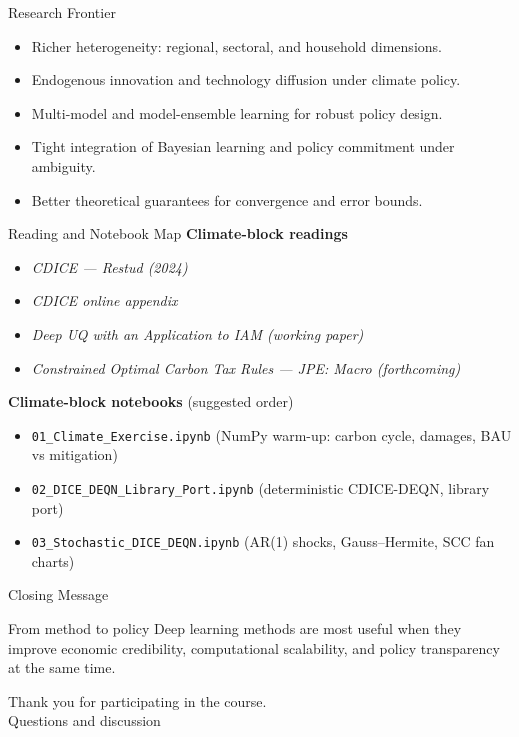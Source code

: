 \documentclass[aspectratio=169,11pt]{beamer}
\newcommand{\emphc}[1]{\textcolor{harvardcrimson}{#1}}
\begin{document}
\begin{frame}{Research Frontier}
\begin{itemize}
    \item Richer heterogeneity: regional, sectoral, and household dimensions.
    \item Endogenous innovation and technology diffusion under climate policy.
    \item Multi-model and model-ensemble learning for robust policy design.
    \item Tight integration of Bayesian learning and policy commitment under ambiguity.
    \item Better theoretical guarantees for convergence and error bounds.
\end{itemize}
\end{frame}

\begin{frame}{Reading and Notebook Map}
\small
\textbf{Climate-block readings}
\begin{itemize}
    \item \textit{CDICE — Restud (2024)}
    \item \textit{CDICE online appendix}
    \item \textit{Deep UQ with an Application to IAM (working paper)}
    \item \textit{Constrained Optimal Carbon Tax Rules — JPE: Macro (forthcoming)}
\end{itemize}

\vspace{0.2cm}
\textbf{Climate-block notebooks} (suggested order)
\begin{itemize}
    \item \texttt{01\_Climate\_Exercise.ipynb} \hfill (NumPy warm-up: carbon cycle, damages, BAU vs mitigation)
    \item \texttt{02\_DICE\_DEQN\_Library\_Port.ipynb} \hfill (deterministic CDICE-DEQN, library port)
    \item \texttt{03\_Stochastic\_DICE\_DEQN.ipynb} \hfill (AR(1) shocks, Gauss--Hermite, SCC fan charts)
\end{itemize}
\end{frame}

\begin{frame}{Closing Message}
\begin{block}{From method to policy}
Deep learning methods are most useful when they improve \emphc{economic credibility},
\emphc{computational scalability}, and \emphc{policy transparency} at the same time.
\end{block}

\vspace{0.5cm}
\begin{center}
{\Large Thank you for participating in the course.}\\[6pt]
{\LARGE \emphc{Questions and discussion}}
\end{center}
\end{frame}
\end{document}
